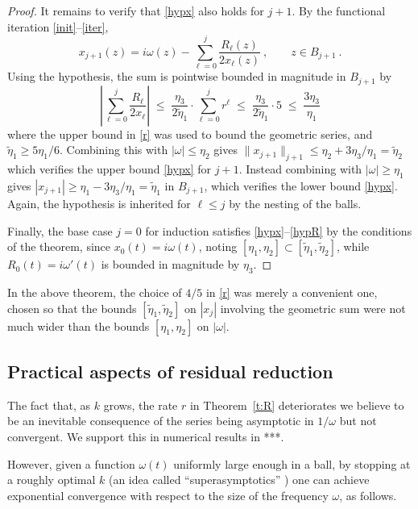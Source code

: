 \documentclass[10pt]{article}
\newcommand{\om}{\omega}
\newcommand{\te}{\tilde\eta}
\begin{document}
\begin{proof}
It remains to verify that \eqref{hypx} also holds for $j+1$.
By the functional iteration \eqref{init}--\eqref{iter},
$$
x_{j+1}(z) = i\om(z) - \sum_{\ell=0}^{j} \frac{R_\ell(z)}{2 x_\ell(z)}~,
\qquad z\in B_{j+1}~.
$$
Using the hypothesis, the sum is pointwise bounded in magnitude
in $B_{j+1}$ by
$$
\left|\sum_{\ell=0}^{j} \frac{R_\ell}{2 x_\ell} \right|
\;\le\; \frac{\eta_3}{2\te_1} \cdot \sum_{\ell=0}^j r^{\ell}
\;\le\; \frac{\eta_3}{2\te_1} \cdot 5
\;\le\; \frac{3\eta_3}{\eta_1}
$$
where the upper bound in \eqref{r} was used to bound the geometric series,
and $\te_1 \ge 5\eta_1/6$.
Combining this with $|\om| \le \eta_2$ gives
$\|x_{j+1}\|_{j+1} \le \eta_2 + 3\eta_3/\eta_1 = \te_2$ which verifies
the upper bound \eqref{hypx} for $j+1$.
Instead combining with $|\om| \ge \eta_1$ gives
$|x_{j+1}| \ge \eta_1 - 3\eta_3/\eta_1 = \te_1$ in $B_{j+1}$,
which verifies the lower bound \eqref{hypx}.
Again, the hypothesis is inherited for $\ell\le j$ by the nesting of the balls.

Finally, the base case $j=0$ for induction
satisfies \eqref{hypx}--\eqref{hypR}
by the conditions of the theorem,
since $x_0(t) = i\om(t)$, noting $[\eta_1,\eta_2] \subset [\te_1,\te_2]$,
while $R_0(t) = i\om'(t)$ is bounded in magnitude by $\eta_3$.
\end{proof}

In the above theorem, the choice of $4/5$ in \eqref{r} was merely a convenient one, chosen so that the bounds $[\te_1,\te_2]$ on $|x_j|$
involving the geometric sum were
not much wider than the bounds $[\eta_1,\eta_2]$ on $|\om|$.


\subsection{Practical aspects of residual reduction}

The fact that, as $k$ grows,
the rate $r$ in Theorem~\ref{t:R} deteriorates
we believe to be an inevitable consequence of
the series being asymptotic in $1/\om$ but not convergent.
We support this in numerical results in ***.

However, given a function $\om(t)$ uniformly large enough
in a ball,
by stopping at a roughly optimal $k$ (an idea
called ``superasymptotics'' \cite{berrysuper,boydsuper})
one can achieve
exponential convergence with respect to the size of the frequency $\om$,
as follows.
\end{document}
